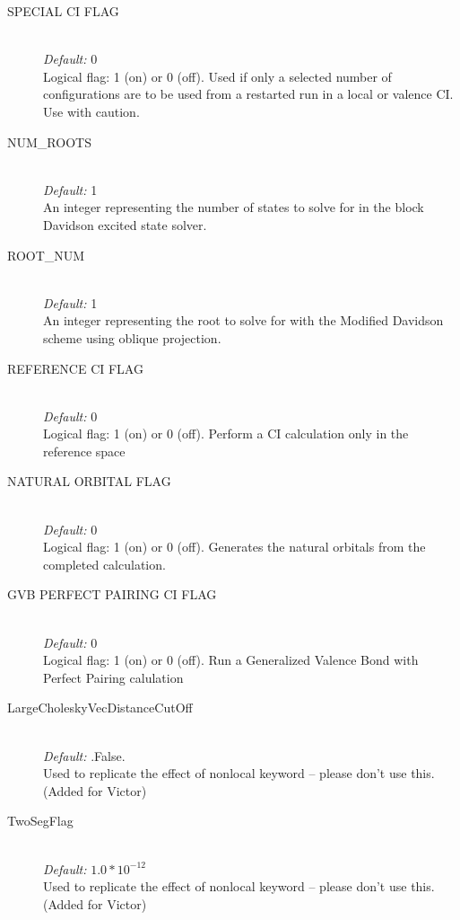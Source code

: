 \documentclass{article}
\begin{document}
\begin{description}
        \item[SPECIAL CI FLAG] \hfill \\
        \emph{Default:} 0 \hfill \\
        Logical flag: 1 (on) or 0 (off). Used if only a selected number of configurations are to be used from a restarted run in a local or valence CI. Use with caution.
        
        \item[NUM\_ROOTS] \hfill \\
        \emph{Default:} 1 \hfill \\
        An integer representing the number of states to solve for in the block Davidson excited state solver. 
        
        \item[ROOT\_NUM] \hfill \\
        \emph{Default:} 1 \hfill \\
        An integer representing the root to solve for with the Modified Davidson scheme using oblique projection. 
 
        \item[REFERENCE CI FLAG] \hfill \\
        \emph{Default:} 0 \hfill \\
        Logical flag: 1 (on) or 0 (off). Perform a CI calculation only in the reference space
        
        \item[NATURAL ORBITAL FLAG] \hfill \\
        \emph{Default: } 0 \hfill \\
        Logical flag: 1 (on) or 0 (off). Generates the natural orbitals from the completed calculation. 
        
        \item[GVB PERFECT PAIRING CI FLAG] \hfill \\
        \emph{Default:} 0 \hfill \\
        Logical flag: 1 (on) or 0 (off). Run a Generalized Valence Bond with Perfect Pairing calulation

       \item[LargeCholeskyVecDistanceCutOff] \hfill \\
        \emph{Default:} .False. \hfill \\
        Used to replicate the effect of nonlocal keyword -- please don't use this.
        (Added for Victor)
        
        \item[TwoSegFlag] \hfill \\
        \emph{Default:} $1.0*10^{-12}$ \hfill \\
        Used to replicate the effect of nonlocal keyword -- please don't use this.
        (Added for Victor)
        

\end{description}
\end{document}
